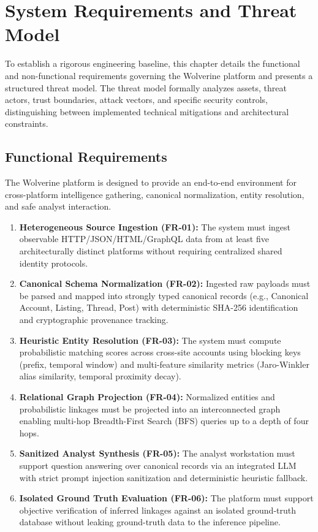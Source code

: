 \chapter{System Requirements and Threat Model}
\label{ch:requirements-threat-model}

To establish a rigorous engineering baseline, this chapter details the functional and non-functional requirements governing the Wolverine platform and presents a structured threat model. The threat model formally analyzes assets, threat actors, trust boundaries, attack vectors, and specific security controls, distinguishing between implemented technical mitigations and architectural constraints.

\section{Functional Requirements}
\label{sec:req-functional}
The Wolverine platform is designed to provide an end-to-end environment for cross-platform intelligence gathering, canonical normalization, entity resolution, and safe analyst interaction.

\begin{enumerate}
    \item \textbf{Heterogeneous Source Ingestion (FR-01):} The system must ingest observable HTTP/JSON/HTML/GraphQL data from at least five architecturally distinct platforms without requiring centralized shared identity protocols.
    \item \textbf{Canonical Schema Normalization (FR-02):} Ingested raw payloads must be parsed and mapped into strongly typed canonical records (e.g., Canonical Account, Listing, Thread, Post) with deterministic SHA-256 identification and cryptographic provenance tracking.
    \item \textbf{Heuristic Entity Resolution (FR-03):} The system must compute probabilistic matching scores across cross-site accounts using blocking keys (prefix, temporal window) and multi-feature similarity metrics (Jaro-Winkler alias similarity, temporal proximity decay).
    \item \textbf{Relational Graph Projection (FR-04):} Normalized entities and probabilistic linkages must be projected into an interconnected graph enabling multi-hop Breadth-First Search (BFS) queries up to a depth of four hops.
    \item \textbf{Sanitized Analyst Synthesis (FR-05):} The analyst workstation must support question answering over canonical records via an integrated LLM with strict prompt injection sanitization and deterministic heuristic fallback.
    \item \textbf{Isolated Ground Truth Evaluation (FR-06):} The platform must support objective verification of inferred linkages against an isolated ground-truth database without leaking ground-truth data to the inference pipeline.
\end{enumerate}

